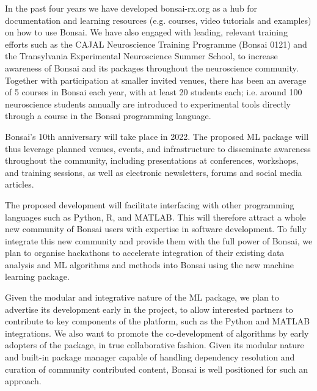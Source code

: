 In the past four years we have developed bonsai-rx.org as a hub for documentation and learning
resources (e.g. courses, video tutorials and examples) on how to use Bonsai. We have also engaged
with leading, relevant training efforts such as the CAJAL Neuroscience
Training Programme (Bonsai 0121) and the Transylvania Experimental Neuroscience
Summer School, to increase awareness of Bonsai and
its packages throughout the neuroscience community. Together with participation
at smaller invited venues, there has been an average of 5 courses in Bonsai
each year, with at least 20 students each; i.e.  around 100 neuroscience students annually are introduced to experimental tools directly through a
course in the Bonsai programming language.

Bonsai's 10th anniversary will take place in 2022. The proposed ML package will thus leverage planned venues, events, and infrastructure to disseminate
awareness throughout the community, including presentations at conferences,
workshops, and training sessions, as well as electronic newsletters, forums and
social media articles.

The proposed development will facilitate interfacing with other programming languages
such as Python, R, and MATLAB. This will therefore attract a whole new
community of Bonsai users with expertise in software development. To fully integrate this new community and provide them with the full power of Bonsai,
we plan to organise hackathons to accelerate integration of their existing data
analysis and ML algorithms and methods into Bonsai using the new
machine learning package.

 Given the modular and integrative nature of the ML package, we
 plan to advertise its development early in the project, to allow interested
 partners to contribute to key
 components of the platform, such as the Python and MATLAB integrations. We
 also want to promote the co-development of algorithms by early adopters of the
 package, in true collaborative fashion. Given its modular nature and built-in
 package manager capable of handling dependency resolution and curation of
 community contributed content, Bonsai is well positioned for such an approach.

